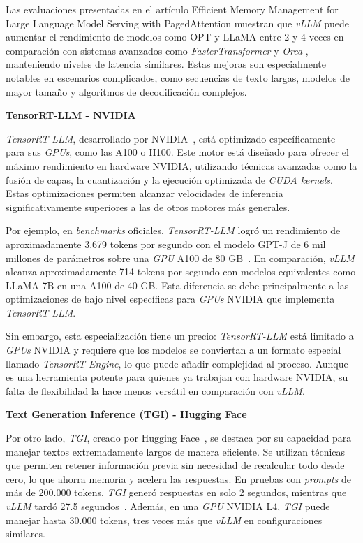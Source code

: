 Las evaluaciones presentadas en el artículo Efficient Memory Management for Large Language Model Serving with PagedAttention \cite{ref39} muestran que \textit{vLLM} puede aumentar el rendimiento de modelos como OPT y LLaMA entre 2 y 4 veces en comparación con sistemas avanzados como \textit{FasterTransformer} \cite{ref70} y \textit{Orca} \cite{ref71}, manteniendo niveles de latencia similares. Estas mejoras son especialmente notables en escenarios complicados, como secuencias de texto largas, modelos de mayor tamaño y algoritmos de decodificación complejos.

\newpage
\noindent \textbf{TensorRT-LLM - NVIDIA}

\textit{TensorRT-LLM}, desarrollado por NVIDIA~\cite{ref12}, está optimizado específicamente para sus \textit{GPUs}, como las A100 o H100. Este motor está diseñado para ofrecer el máximo rendimiento en hardware NVIDIA, utilizando técnicas avanzadas como la fusión de capas, la cuantización y la ejecución optimizada de \textit{CUDA kernels}. Estas optimizaciones permiten alcanzar velocidades de inferencia significativamente superiores a las de otros motores más generales.

Por ejemplo, en \textit{benchmarks} oficiales, \textit{TensorRT-LLM} logró un rendimiento de aproximadamente 3.679 tokens por segundo con el modelo GPT-J de 6 mil millones de parámetros sobre una \textit{GPU} A100 de 80 GB~\cite{ref13}. En comparación, \textit{vLLM} alcanza aproximadamente 714 tokens por segundo con modelos equivalentes como LLaMA-7B en una A100 de 40 GB. Esta diferencia se debe principalmente a las optimizaciones de bajo nivel específicas para \textit{GPUs} NVIDIA que implementa \textit{TensorRT-LLM}.

Sin embargo, esta especialización tiene un precio: \textit{TensorRT-LLM} está limitado a \textit{GPUs} NVIDIA y requiere que los modelos se conviertan a un formato especial llamado \textit{TensorRT Engine}, lo que puede añadir complejidad al proceso. Aunque es una herramienta potente para quienes ya trabajan con hardware NVIDIA, su falta de flexibilidad la hace menos versátil en comparación con \textit{vLLM}.

\vspace{0.5cm}
\noindent\textbf{Text Generation Inference (TGI) - Hugging Face}

Por otro lado, \textit{TGI}, creado por Hugging Face~\cite{ref14}, se destaca por su capacidad para manejar textos extremadamente largos de manera eficiente. Se utilizan técnicas que permiten retener información previa sin necesidad de recalcular todo desde cero, lo que ahorra memoria y acelera las respuestas. En pruebas con \textit{prompts} de más de 200.000 tokens, \textit{TGI} generó respuestas en solo 2 segundos, mientras que \textit{vLLM} tardó 27.5 segundos~\cite{ref15}. Además, en una \textit{GPU} NVIDIA L4, \textit{TGI} puede manejar hasta 30.000 tokens, tres veces más que \textit{vLLM} en configuraciones similares.


